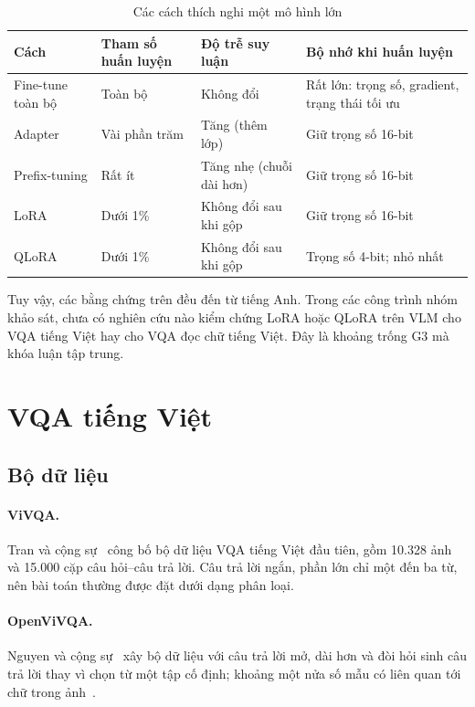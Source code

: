 \begin{table}[htbp]
\caption{Các cách thích nghi một mô hình lớn}
\label{tab:rel-peft}
\centering
\small
\begin{tabular}{p{}p{}p{}p{}}
\toprule
\textbf{Cách} & \textbf{Tham số huấn luyện} & \textbf{Độ trễ suy luận} & \textbf{Bộ nhớ khi huấn luyện} \\
\midrule
Fine-tune toàn bộ & Toàn bộ & Không đổi & Rất lớn: trọng số, gradient, trạng thái tối ưu \\
Adapter & Vài phần trăm & Tăng (thêm lớp) & Giữ trọng số 16-bit \\
Prefix-tuning & Rất ít & Tăng nhẹ (chuỗi dài hơn) & Giữ trọng số 16-bit \\
LoRA & Dưới 1\% & Không đổi sau khi gộp & Giữ trọng số 16-bit \\
QLoRA & Dưới 1\% & Không đổi sau khi gộp & Trọng số 4-bit; nhỏ nhất \\
\bottomrule
\end{tabular}
\end{table}

Tuy vậy, các bằng chứng trên đều đến từ tiếng Anh. Trong các công trình nhóm khảo
sát, chưa có nghiên cứu nào kiểm chứng LoRA hoặc QLoRA trên VLM cho VQA tiếng Việt
hay cho VQA đọc chữ tiếng Việt. Đây là khoảng trống G3 mà khóa luận tập trung.

\section{VQA tiếng Việt}
\label{sec:rel-vivqa}

\subsection{Bộ dữ liệu}

\paragraph{ViVQA.} Tran và cộng sự~\cite{tran2021vivqa} công bố bộ dữ liệu VQA tiếng Việt đầu
tiên, gồm 10.328 ảnh và 15.000 cặp câu hỏi--câu trả lời. Câu trả lời ngắn, phần
lớn chỉ một đến ba từ, nên bài toán thường được đặt dưới dạng phân loại.

\paragraph{OpenViVQA.} Nguyen và cộng sự~\cite{nguyen2023openvivqa} xây bộ dữ liệu với câu trả lời
mở, dài hơn và đòi hỏi sinh câu trả lời thay vì chọn từ một tập cố định; khoảng
một nửa số mẫu có liên quan tới chữ trong ảnh~\cite{nguyen2024vitextvqa}.

